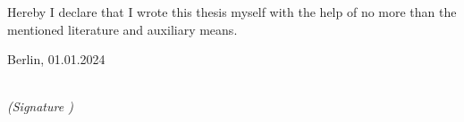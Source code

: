 \newpage

\thispagestyle{empty}

\begin{large}

\vspace*{6cm}

\noindent
Hereby I declare that I wrote this thesis myself with the help of no more than the mentioned literature and auxiliary means.
\vspace{2cm}

\noindent
Berlin, 01.01.2024\\ %

\vspace{3cm}

\hspace*{7cm}%
\dotfill\\
\hspace*{8.5cm}%
\textit{(Signature )}

\end{large}
